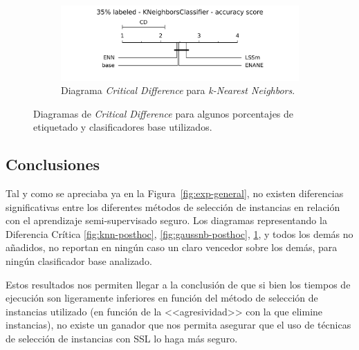 \begin{figure}
\begin{subfigure}[b]{0.475\textwidth}
            \label{fig:tree-posthoc}
        \end{subfigure}
        \hfill
        \begin{subfigure}[b]{0.475\textwidth}   
            \centering 
            \includegraphics[width=\textwidth]{../img/memoria/aspectos-relevantes/knn2-posthoc}
            \caption[]%
            {{\tiny Diagrama \textit{Critical Difference} para \textit{k-Nearest Neighbors}.}}    
            \label{fig:knn2-posthoc}
        \end{subfigure}
        \caption[Diagramas de \textit{Critical Difference} para algunos porcentajes de etiquetado y clasificadores base utilizados.]
        {\small Diagramas de \textit{Critical Difference} para algunos porcentajes de etiquetado y clasificadores base utilizados.}
        \label{fig:CDs}
    \end{figure}

\FloatBarrier
\subsection{Conclusiones}
Tal y como se apreciaba ya en la Figura~\ref{fig:exp-general}, no existen diferencias significativas entre los diferentes métodos de selección de instancias en relación con el aprendizaje semi-supervisado seguro. Los diagramas representando la Diferencia Crítica \ref{fig:knn-posthoc}, \ref{fig:gaussnb-posthoc}, \ref{fig:tree-posthoc}, y todos los demás no añadidos, no reportan en ningún caso un claro vencedor sobre los demás, para ningún clasificador base analizado. 

Estos resultados nos permiten llegar a la conclusión de que si bien los tiempos de ejecución son ligeramente inferiores en función del método de selección de instancias utilizado (en función de la <<agresividad>> con la que elimine instancias), no existe un ganador que nos permita asegurar que el uso de técnicas de selección de instancias con SSL lo haga más seguro.


